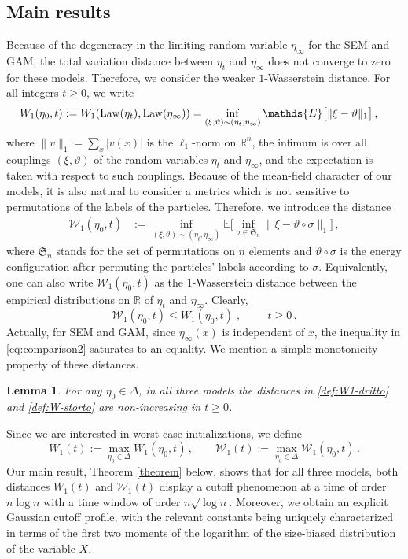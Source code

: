 \documentclass[11pt,reqno]{amsart}
\newtheorem{lemma}[theorem]{Lemma}
\theoremstyle{remark}
\theoremstyle{definition}
\numberwithin{equation}{section}
\numberwithin{figure}{section}
\newcommand{\E}{\mathds{E}}
\newcommand{\R}{\mathbb{R}}
\newcommand{\comma}{\; \text{,}\;\;}
\newcommand{\cW}{\ensuremath{\mathcal W}}
\let\D=\Delta \let\F=\Phi  \let\G=\Gamma  \let\L=\Lambda \let\The=\Theta
\begin{document}
\subsection{Main results}
Because of the degeneracy in the limiting random variable $\eta_\infty$ for the SEM and GAM, the total variation distance between $\eta_t$ and $\eta_\infty$ does not converge to zero for these models. Therefore, we consider the weaker $1$-Wasserstein distance. 
 For all integers 	$t\ge 0$, we write
	\begin{align}\label{def:W1-dritto}
	W_1(\eta_0,t)&:=	W_1({\rm Law}(\eta_t),{\rm Law}(\eta_\infty))= \inf_{(\xi,\vartheta)\sim(\eta_t,\eta_{\infty})}\E\big[\|\xi-\vartheta\|_1\big]\,,
\end{align}
where $\|v\|_1=\sum_x|v(x)|$ is the $\ell_1$-norm on $\R^n$, the infimum is over all couplings $(\xi,\vartheta)$ of the random variables $\eta_t$ and $\eta_\infty$, and the expectation is taken with respect to such couplings. 
Because of the mean-field character of our models, it is also natural 
to consider a metrics which is not sensitive to  permutations of the labels of the particles. Therefore, we introduce the distance
\begin{align}\label{def:W-storto}
	\cW_1(\eta_0,t)&:= \inf_{(\xi,\vartheta)\sim(\eta_t,\eta_{\infty})}\E\Big[\inf_{\sigma \in \mathfrak S_n} \|\xi-\vartheta\circ\sigma\|_1\Big]\,,
\end{align}
 where $\mathfrak S_n$ stands for the set of permutations on $n$ elements and $\vartheta\circ\sigma$ is the energy configuration after permuting the particles' labels according to $\sigma$. Equivalently, one can also write $ \cW_1(\eta_0,t)$ as the $1$-Wasserstein distance between the empirical distributions on $\R$ of $\eta_t$ and $\eta_{\infty}$.  
Clearly, 
\begin{equation}\label{eq:comparison2}
	\cW_1(\eta_0,t)\le W_1(\eta_{0},t)\comma
	\qquad t \ge 0\,.
\end{equation}
Actually, for SEM and GAM, since $\eta_\infty(x)$ is independent of $x$, the inequality in \eqref{eq:comparison2} saturates to an equality.
We mention a simple monotonicity property of these distances. 


\begin{lemma}\label{lemma:monotone}
For any  $\eta_0\in\D$, in all three models 
the distances in \eqref{def:W1-dritto} and \eqref{def:W-storto} are non-increasing in $t\ge 0$. 
\end{lemma}
		Since we are interested in worst-case initializations, we define 
	\begin{equation}\label{def:worst}
W_1(t):= \max_{\eta_0\in\D}W_1(\eta_0,t)\,,\qquad 	\cW_1(t):= \max_{\eta_0\in\D}\cW_1(\eta_0,t)\,.
\end{equation}
Our main result, Theorem \ref{theorem} below, shows that for all three models, both distances	$W_1(t)$ and $\cW_1(t)$ display a cutoff phenomenon at a time of order $n\log n$ with a time window of order  $n\sqrt{\log n}$. Moreover, we obtain an explicit Gaussian cutoff profile, with the relevant constants being uniquely characterized in terms of the first two moments of the logarithm of the size-biased distribution of the variable $X$. 
	
\end{document}
